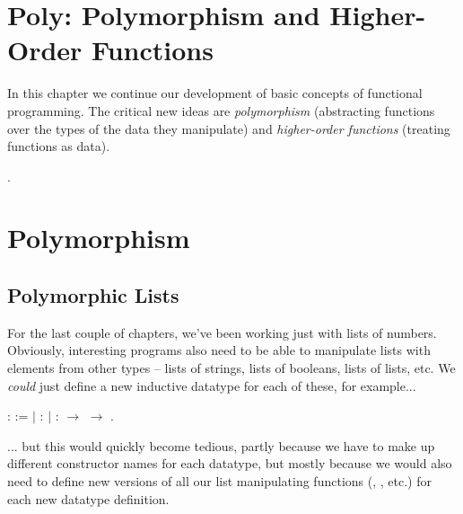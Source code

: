 \documentclass[12pt]{report}
\begin{document}
\section{Poly: Polymorphism and Higher-Order Functions}



 In this chapter we continue our development of basic 
    concepts of functional programming.  The critical new ideas are
    \textit{polymorphism} (abstracting functions over the types of the data
    they manipulate) and \textit{higher-order functions} (treating functions
    as data).
\begin{coqdoccode}
\coqdocemptyline
\coqdocnoindent
{}  .\coqdoceol
\coqdocemptyline
\end{coqdoccode}
\section{Polymorphism}

\begin{coqdoccode}
\end{coqdoccode}
\subsection{Polymorphic Lists}



 For the last couple of chapters, we've been working just
    with lists of numbers.  Obviously, interesting programs also need
    to be able to manipulate lists with elements from other types --
    lists of strings, lists of booleans, lists of lists, etc.  We
    \textit{could} just define a new inductive datatype for each of these,
    for example... \begin{coqdoccode}
\coqdocemptyline
\coqdocnoindent
{}  :  :=\coqdoceol
\coqdocindent{1.00em}
\ensuremath{|}  : \coqdoceol
\coqdocindent{1.00em}
\ensuremath{|}  :  \ensuremath{\rightarrow}  \ensuremath{\rightarrow} .\coqdoceol
\coqdocemptyline
\end{coqdoccode}
... but this would quickly become tedious, partly because we
    have to make up different constructor names for each datatype, but
    mostly because we would also need to define new versions of all
    our list manipulating functions (, , etc.)  for each
    new datatype definition. 
\end{document}
